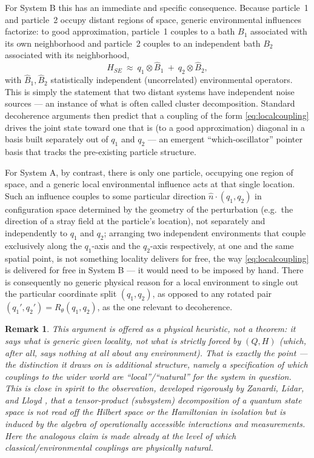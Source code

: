 \documentclass[11pt]{article}
\newtheorem{remark}{Remark}
\begin{document}
For System B this has an immediate and specific consequence. Because particle~1 and particle~2 occupy distant regions of space, generic environmental influences factorize: to good approximation, particle~1 couples to a bath $B_1$ associated with its own neighborhood and particle~2 couples to an independent bath $B_2$ associated with its neighborhood,
\begin{equation}
H_{SE}\ \approx\ q_1\otimes \hat B_1 \ +\ q_2\otimes \hat B_2 ,
\label{eq:localcoupling}
\end{equation}
with $\hat B_1,\hat B_2$ statistically independent (uncorrelated) environmental operators. This is simply the statement that two distant systems have independent noise sources --- an instance of what is often called cluster decomposition. Standard decoherence arguments \cite{Zurek2003} then predict that a coupling of the form \eqref{eq:localcoupling} drives the joint state toward one that is (to a good approximation) diagonal in a basis built separately out of $q_1$ and $q_2$ --- an emergent ``which-oscillator'' pointer basis that tracks the pre-existing particle structure.

For System A, by contrast, there is only one particle, occupying one region of space, and a generic local environmental influence acts at that single location. Such an influence couples to some particular direction $\hat n\cdot(q_1,q_2)$ in configuration space determined by the geometry of the perturbation (e.g.\ the direction of a stray field at the particle's location), not separately and independently to $q_1$ and $q_2$; arranging two independent environments that couple exclusively along the $q_1$-axis and the $q_2$-axis respectively, at one and the same spatial point, is not something locality delivers for free, the way \eqref{eq:localcoupling} is delivered for free in System B --- it would need to be imposed by hand. There is consequently no generic physical reason for a local environment to single out the particular coordinate split $(q_1,q_2)$, as opposed to any rotated pair $(q_1',q_2')=R_\theta(q_1,q_2)$, as the one relevant to decoherence.

\begin{remark}
This argument is offered as a physical heuristic, not a theorem: it says what is \emph{generic} given locality, not what is strictly forced by $(Q,H)$ (which, after all, says nothing at all about any environment). That is exactly the point --- the distinction it draws on is additional structure, namely a specification of which couplings to the wider world are ``local''/``natural'' for the system in question. This is close in spirit to the observation, developed rigorously by Zanardi, Lidar, and Lloyd \cite{ZanardiLidarLloyd2004}, that a tensor-product (subsystem) decomposition of a quantum state space is not read off the Hilbert space or the Hamiltonian in isolation but is induced by the algebra of operationally accessible interactions and measurements. Here the analogous claim is made already at the level of which classical/environmental couplings are physically natural.
\end{remark}
\end{document}
